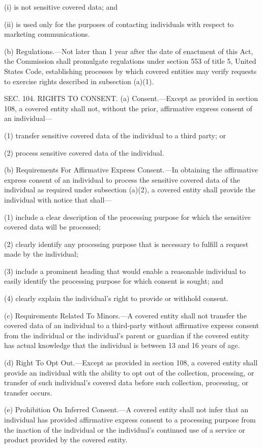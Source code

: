 (i) is not sensitive covered data; and

(ii) is used only for the purposes of contacting individuals with respect to marketing communications.

(b) Regulations.—Not later than 1 year after the date of enactment of this Act, the Commission shall promulgate regulations under section 553 of title 5, United States Code, establishing processes by which covered entities may verify requests to exercise rights described in subsection (a)(1).


SEC. 104. RIGHTS TO CONSENT.
(a) Consent.—Except as provided in section 108, a covered entity shall not, without the prior, affirmative express consent of an individual—

(1) transfer sensitive covered data of the individual to a third party; or

(2) process sensitive covered data of the individual.

(b) Requirements For Affirmative Express Consent.—In obtaining the affirmative express consent of an individual to process the sensitive covered data of the individual as required under subsection (a)(2), a covered entity shall provide the individual with notice that shall—

(1) include a clear description of the processing purpose for which the sensitive covered data will be processed;

(2) clearly identify any processing purpose that is necessary to fulfill a request made by the individual;

(3) include a prominent heading that would enable a reasonable individual to easily identify the processing purpose for which consent is sought; and

(4) clearly explain the individual’s right to provide or withhold consent.

(c) Requirements Related To Minors.—A covered entity shall not transfer the covered data of an individual to a third-party without affirmative express consent from the individual or the individual’s parent or guardian if the covered entity has actual knowledge that the individual is between 13 and 16 years of age.

(d) Right To Opt Out.—Except as provided in section 108, a covered entity shall provide an individual with the ability to opt out of the collection, processing, or transfer of such individual’s covered data before such collection, processing, or transfer occurs.

(e) Prohibition On Inferred Consent.—A covered entity shall not infer that an individual has provided affirmative express consent to a processing purpose from the inaction of the individual or the individual's continued use of a service or product provided by the covered entity.

